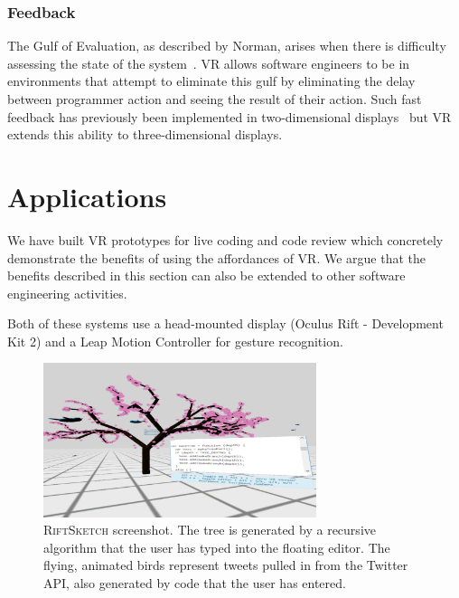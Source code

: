 \documentclass[conference]{IEEEtran}
\begin{document}

\subsubsection{Feedback}
The Gulf of Evaluation, as described by Norman, arises when there is difficulty assessing the state of the system~\cite{Norman:DesignOfEverydayThings}.  VR allows software engineers to be in environments that attempt to eliminate this gulf by eliminating the delay between programmer action and seeing the result of their action. Such fast feedback has previously been implemented in two-dimensional displays~\cite{Burnett:LivenessLevel4} but VR extends this ability to three-dimensional displays.






\section{Applications}

We have built VR prototypes for live coding and code review which concretely demonstrate the benefits of using the affordances of VR.
We argue that the benefits described in this section can also be extended to other software engineering activities.

Both of these systems use a head-mounted display (Oculus Rift - Development Kit 2) and a Leap Motion Controller for gesture recognition.

\begin{figure}[ht!]
\centering
\includegraphics[width=80mm]{figures/riftsketch/unwarped_tree}
\caption{\textsc{RiftSketch} screenshot. The tree is generated by a recursive algorithm that the user has typed into the floating editor. The flying, animated birds represent tweets pulled in from the Twitter API, also generated by code that the user has entered. \label{fig:RiftSketch}}
\end{figure}
\end{document}
